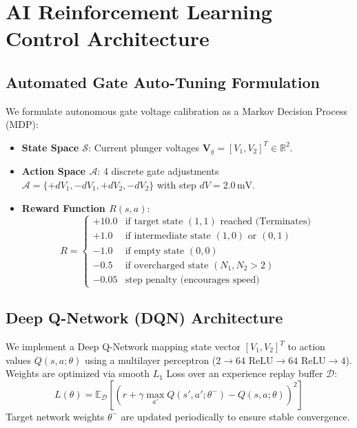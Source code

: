 \documentclass[journal,twocolumn,10pt]{IEEEtran}
\begin{document}
\section{AI Reinforcement Learning Control Architecture}

\subsection{Automated Gate Auto-Tuning Formulation}
We formulate autonomous gate voltage calibration as a Markov Decision Process (MDP):
\begin{itemize}
    \item \textbf{State Space $\mathcal{S}$}: Current plunger voltages $\mathbf{V}_g = [V_1, V_2]^T \in \mathbb{R}^2$.
    \item \textbf{Action Space $\mathcal{A}$}: 4 discrete gate adjustments $\mathcal{A} = \{+dV_1, -dV_1, +dV_2, -dV_2\}$ with step $dV = 2.0\,\text{mV}$.
    \item \textbf{Reward Function $R(s, a)$}:
    \begin{equation}
    R = \begin{cases}
    +10.0 & \text{if target state } (1,1) \text{ reached (Terminates)} \\
    +1.0 & \text{if intermediate state } (1,0) \text{ or } (0,1) \\
    -1.0 & \text{if empty state } (0,0) \\
    -0.5 & \text{if overcharged state } (N_1, N_2 > 2) \\
    -0.05 & \text{step penalty (encourages speed)}
    \end{cases}
    \end{equation}
\end{itemize}

\subsection{Deep Q-Network (DQN) Architecture}
We implement a Deep Q-Network mapping state vector $[V_1, V_2]^T$ to action values $Q(s, a; \theta)$ using a multilayer perceptron ($2 \to 64 \text{ ReLU} \to 64 \text{ ReLU} \to 4$). Weights are optimized via smooth $L_1$ Loss over an experience replay buffer $\mathcal{D}$:
\begin{equation}
L(\theta) = \mathbb{E}_{\mathcal{D}} \left[ \left( r + \gamma \max_{a'} Q(s', a'; \theta^-) - Q(s, a; \theta) \right)^2 \right]
\end{equation}
Target network weights $\theta^-$ are updated periodically to ensure stable convergence.
\end{document}
